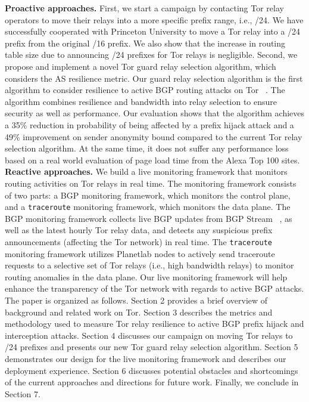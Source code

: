 \textbf{Proactive approaches.} First, we start a campaign by contacting Tor relay operators to move their relays into a more specific prefix range, i.e., /24. We have successfully cooperated with Princeton University to move a Tor relay into a /24 prefix from the original /16 prefix. We also show that the increase in routing table size due to announcing /24 prefixes for Tor relays is negligible. Second, we propose and implement a novel Tor guard relay selection algorithm, which considers the AS resilience metric. Our guard relay selection algorithm is the first algorithm to consider resilience to active BGP routing attacks on Tor ~\cite{sun2015raptor}. The algorithm combines resilience and bandwidth into relay selection to ensure security as well as performance. Our evaluation shows that the algorithm achieves a 35\% reduction in probability of being affected by a prefix hijack attack and a 49\% improvement on sender anonymity bound compared to the current Tor relay selection algorithm. At the same time, it does not suffer any performance loss based on a real world evaluation of page load time from the Alexa Top 100 sites. 
\\
\textbf{Reactive approaches.} We build a live monitoring framework that monitors routing activities on Tor relays in real time. The monitoring framework consists of two parts: a BGP monitoring framework, which monitors the control plane, and a {\tt traceroute} monitoring framework, which monitors the data plane. The BGP monitoring framework collects live BGP updates from BGP Stream ~\cite{bgpstream}, as well as the latest hourly Tor relay data, and detects any suspicious prefix announcements (affecting the Tor network) in real time. The {\tt traceroute} monitoring framework utilizes Planetlab nodes to actively send traceroute requests to a selective set of Tor relays (i.e., high bandwidth relays) to monitor routing anomalies in the data plane. Our live monitoring framework will help enhance the transparency of the Tor network with regards to active BGP attacks.
\\
The paper is organized as follows. Section 2 provides a brief overview of background and related work on Tor.  Section 3 describes the metrics and methodology used to measure Tor relay resilience to active BGP prefix hijack and interception attacks. Section 4 discusses our campaign on moving Tor relays to /24 prefixes and presents our new Tor guard relay selection algorithm. Section 5 demonstrates our design for the live monitoring framework and describes our deployment experience. Section 6 discusses potential obstacles and shortcomings of the current approaches and directions for future work. Finally, we conclude in Section 7. 
